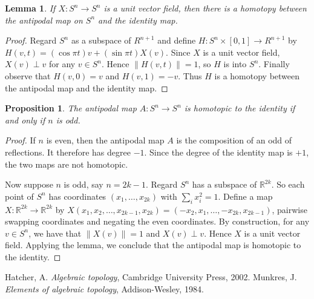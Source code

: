 \documentclass[12pt]{article}
\newtheorem*{lemma*}{Lemma}
\newtheorem*{proposition*}{Proposition}
\begin{document}
\begin{lemma*}
If $X\colon S^n\to S^n$ is a unit vector field, then
there is a homotopy between the antipodal map on $S^{n}$
and the identity map.
\end{lemma*}

\begin{proof}
Regard $S^n$ as a subspace of $R^{n+1}$ and define
$H\colon S^n\times[0,1]\to R^{n+1}$ by 
$H(v,t)=(\cos\pi t)v+(\sin\pi t)X(v)$.  Since $X$ is a unit
vector field, $X(v)\perp v$ for any $v\in S^n$.  Hence
$\|H(v,t)\|=1$, so $H$ is into $S^n$.  Finally observe that
$H(v,0)=v$ and $H(v,1)=-v$.  Thus $H$ is a homotopy between
the antipodal map and the identity map.
\end{proof}

\begin{proposition*}
The antipodal map $A\colon S^n\to S^n$ is homotopic
to the identity if and only if $n$ is odd.
\end{proposition*}

\begin{proof}
If $n$ is even, then the antipodal map $A$ is the composition 
of an odd  of reflections.  It 
therefore has degree $-1$.  Since the degree of the identity
map is $+1$, the two maps are not homotopic.

Now suppose $n$ is odd, say $n=2k-1$.  Regard $S^n$ has a 
subspace of $\mathbb{R}^{2k}$.  So each point of $S^n$ has
coordinates $(x_1,\dots,x_{2k})$ with $\sum_i x_i^2=1$.  Define
a map $X\colon\mathbb{R}^{2k}\to\mathbb{R}^{2k}$ by
$X(x_1,x_2,\dots,x_{2k-1},x_{2k})=(-x_2,x_1,\dots,-x_{2k},x_{2k-1})$,
pairwise swapping coordinates and negating the even coordinates.
By construction, for any $v\in S^n$, we have that $\|X(v)\|=1$
and $X(v)\perp v$.  Hence $X$ is a unit vector field.  Applying the
lemma, we conclude that the antipodal map is homotopic to the identity.
\end{proof}

\begin{thebibliography}{9}
Hatcher, A. {\em Algebraic topology}, Cambridge University Press, 2002.
Munkres, J. {\em Elements of algebraic topology}, Addison-Wesley, 1984.
\end{thebibliography}
\end{document}
